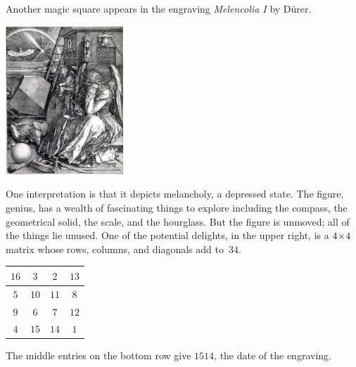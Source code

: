 Another magic square appears in the engraving
\textit{Melencolia I} by D\"urer.
\begin{center}
  \includegraphics[height=2.20in]{map/pix/Melencolia.jpg} %
\end{center}
One interpretation is that it depicts melancholy, a depressed state.
The figure, genius,
has a wealth of fascinating things to explore including
the compass, the geometrical solid, the scale, and the hourglass.
But the figure is unmoved; all of the things lie unused.
One of the potential delights, in the upper right,
is a $4 \! \times \! 4$ matrix whose
rows, columns, and diagonals add to~$34$.
\begin{center}
  \hspace{.8in}
  \begin{tabular}{|c|c|c|c|}
    \hline
      $16$  &$3$  &$2$  &$13$  \\ \hline
      $5$   &$10$ &$11$ &$8$   \\ \hline
      $9$   &$6$  &$7$  &$12$  \\ \hline    
      $4$   &$15$ &$14$ &$1$  \\ \hline  
  \end{tabular}
\end{center}
The middle entries on the bottom row give $1514$, the 
date of the engraving.

